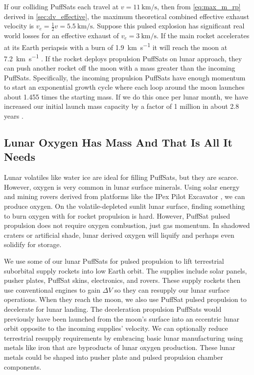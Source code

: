 \documentclass{article}
\begin{document}
{If our colliding PuffSats each travel at $v=\SI{11}{\kilo\meter\per\second}$, then from \autoref{eq:max_m_rp} derived in \autoref{sec:dv_effective},  the maximum theoretical combined effective exhaust velocity is $v_e = \frac{1}{2}v = \SI {5.5}{\kilo\meter\per\second}$.  Suppose this pulsed explosion has significant real world losses for an effective exhaust of $v_e = \SI{3}{\kilo\meter\per\second}$.   If the main rocket accelerates at its Earth periapsis with a burn of \SI{1.9}{\kilo\meter\per\second} it will reach the moon at \SI{7.2}{\kilo\meter\per\second} \cite{Katz_aim_is_all_you_need_2025}.   If the rocket deploys propulsion PuffSats on lunar approach, they can push another rocket off the moon with a mass greater than the incoming PuffSats. Specifically, the incoming propulsion PuffSats have enough momentum to start an exponential growth cycle where each loop around the moon launches about 1.455 times the starting mass.   If we do this once per lunar month, we have increased our initial launch mass capacity by a factor of 1 million in about 2.8 years \cite{Katz_aim_is_all_you_need_2025}. 

\subsection{Lunar Oxygen Has Mass And That Is All It Needs}\label{sec:lunar_mining}
Lunar volatiles like water ice are ideal for filling PuffSats, but they are scarce.   However, oxygen is very common in lunar surface minerals.   Using solar energy and mining rovers derived from platforms like the IPex Pilot Excavator \cite{ipex_pilot_excavator}, we can produce oxygen.  On the volatile-depleted sunlit lunar surface, finding something to burn oxygen with for rocket propulsion is hard.   However, PuffSat pulsed propulsion does not require oxygen combustion, just gas momentum.  In shadowed craters or artificial shade, lunar derived oxygen will liquify and perhaps even solidify for storage.  

We use some of our lunar PuffSats for pulsed propulsion to lift terrestrial suborbital supply rockets into low Earth orbit.  The supplies include solar panels, pusher plates, PuffSat skins, electronics, and rovers. These supply rockets then use conventional engines to gain \(\Delta V\) so they can resupply our lunar surface operations.   When they reach the moon, we also use PuffSat pulsed propulsion to decelerate for lunar landing.  The deceleration propulsion PuffSats would previously have been launched from the moon's surface into an eccentric lunar orbit opposite to the incoming supplies' velocity.   We can optionally reduce terrestrial resupply requirements by embracing basic lunar manufacturing using metals like iron that are byproducts of lunar oxygen production.  These lunar metals could be shaped into pusher plate and pulsed propulsion chamber components.  

}
\end{document}
